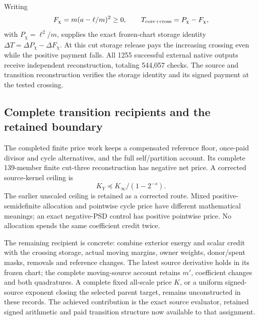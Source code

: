 Writing
\[
 F_\chi=m(a-\ell/m)^2\geq0,\qquad
 T_{\rm core+cross}=P_\chi-F_\chi,
\]
with \(P_\chi=\ell^2/m\), supplies the exact frozen-chart storage
identity \(\Delta T=\Delta P_\chi-\Delta F_\chi\).
At this cut storage release pays the increasing crossing even while
the positive payment falls. All 1255 successful external native
outputs receive independent reconstruction, totaling 544,057
checks. The source and transition reconstruction verifies the storage identity and its signed payment at the tested crossing.

\subsection{Complete transition recipients and the retained boundary}

The completed finite price work keeps a compensated reference floor,
once-paid divisor and cycle alternatives, and the full self/partition
account. Its complete 139-member finite cut-three reconstruction has
negative net price. A corrected source-kernel ceiling is
\[
 K_Y\preceq K_\infty/(1-2^{-s}).
\]
The earlier unscaled ceiling is retained as a corrected route.
Mixed positive-semidefinite allocation and pointwise cycle price
have different mathematical meanings; an exact negative-PSD control
has positive pointwise price. No allocation spends the same
coefficient credit twice.

The remaining recipient is concrete: combine exterior energy and
scalar credit with the crossing storage, actual moving margins,
owner weights, donor/spent masks, removals and reference changes.
The latest source derivative holds in its frozen chart; the complete
moving-source account retains \(m'\), coefficient changes and both
quadratures. A complete fixed all-scale price \(K\), or a uniform
signed-source exponent closing the selected parent target, remains
unconstructed in these records. The achieved contribution is the
exact source evaluator, retained signed arithmetic and paid
transition structure now available to that assignment.
